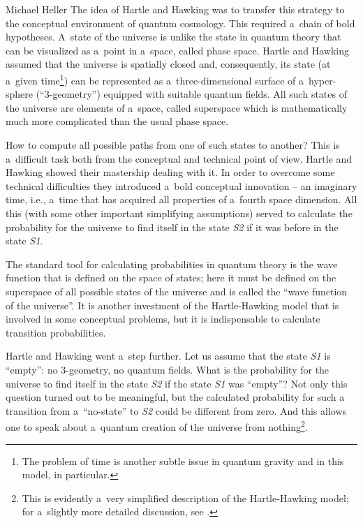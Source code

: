 \begin{artengenv}{Michael Heller}
The idea of Hartle and Hawking was to transfer this strategy to the conceptual environment of quantum cosmology.
This required a~chain of bold hypotheses. A~state of the universe is unlike the state in quantum theory that can be
visualized as a~point in a~space, called phase space. Hartle and Hawking assumed that the universe is spatially closed
and, consequently, its state (at a~given time\footnote{The problem of time is another subtle issue in quantum gravity
and in this model, in particular.}) can be represented as a~three-dimensional surface of a~hyper-sphere (``3-geometry'')
equipped with suitable quantum fields. All such states of the universe are elements of a~space, called superspace which
is mathematically much more complicated than the usual phase space.

How to compute all possible paths from one of such states to another? This is a~difficult task both from the
conceptual and technical point of view. Hartle and Hawking showed their mastership dealing with it. In order to
overcome some technical difficulties they introduced a~bold conceptual innovation – an imaginary time, i.e., a~time
that has acquired all properties of a~fourth space dimension. All this (with some other important simplifying
assumptions) served to calculate the probability for the universe to find itself in the state \textit{S2} if it was
before in the state \textit{S1}.

The standard tool for calculating probabilities in quantum theory is the wave function that is defined on the space
of states; here it must be defined on the superspace of all possible states of the universe and is called the ``wave
function of the universe''. It is another investment of the Hartle-Hawking model that is involved in some conceptual
problems, but it is indispensable to calculate transition probabilities.

Hartle and Hawking went a~step further. Let us assume that the state \textit{S1} is ``empty'': no 3-geometry, no
quantum fields. What is the probability for the universe to find itself in the state \textit{S2} if the state
\textit{S1} was ``empty''? Not only this question turned out to be meaningful, but the calculated probability for such a
transition from a~``no-state'' to \textit{S2} could be different from zero. And this allows one to speak about a~quantum
creation of the universe from nothing\footnote{This is evidently a~very simplified description of the Hartle-Hawking
model; for a~slightly more detailed discussion, see \parencite[pp.~68–73]{heller_ultimate_2009}.}.


\end{artengenv}
